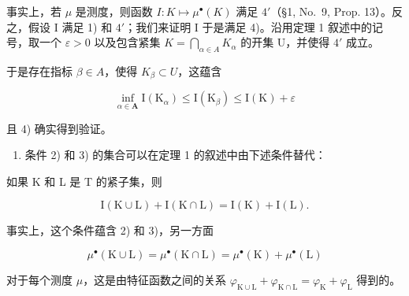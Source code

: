 事实上，若 \(\mu\) 是测度，则函数 \(I: K \mapsto \mu^{\bullet}(K)\) 满足 \(4'\)（§1, No.~9, Prop. 13）。反之，假设 I 满足 1) 和 \(4'\)；我们来证明 I 于是满足 4)。沿用定理 1 叙述中的记号，取一个 \(\varepsilon > 0\) 以及包含紧集 \(K = \bigcap_{\alpha \in A} K_{\alpha}\) 的开集 U，并使得 \(4'\) 成立。

于是存在指标 \(\beta \in A\)，使得 \(K_{\beta} \subset U\)，这蕴含

\[
\inf _ {\alpha \in \mathbf {A}} \mathrm{I} (\mathrm{K} _ {\alpha}) \leqslant \mathrm{I} (\mathrm{K} _ {\beta}) \leqslant \mathrm{I} (\mathrm{K}) + \varepsilon
\]

且 4) 确实得到验证。

\begin{enumerate}
\def\labelenumi{\arabic{enumi})}
\setcounter{enumi}{1}
\tightlist
\item
  条件 2) 和 3) 的集合可以在定理 1 的叙述中由下述条件替代：
\end{enumerate}

如果 K 和 L 是 T 的紧子集，则

\[
\mathrm{I} (\mathrm{K} \cup \mathrm{L}) + \mathrm{I} (\mathrm{K} \cap \mathrm{L}) = \mathrm{I} (\mathrm{K}) + \mathrm{I} (\mathrm{L}).
\]

事实上，这个条件蕴含 2) 和 3)，另一方面

\[
\mu^ {\bullet} (\mathrm{K} \cup \mathrm{L}) = \mu^ {\bullet} (\mathrm{K} \cap \mathrm{L}) = \mu^ {\bullet} (\mathrm{K}) + \mu^ {\bullet} (\mathrm{L})
\]

对于每个测度 \(\mu\)，这是由特征函数之间的关系 \(\varphi_{\mathrm{K}\cup\mathrm{L}} + \varphi_{\mathrm{K}\cap\mathrm{L}} = \varphi_{\mathrm{K}} + \varphi_{\mathrm{L}}\) 得到的。

